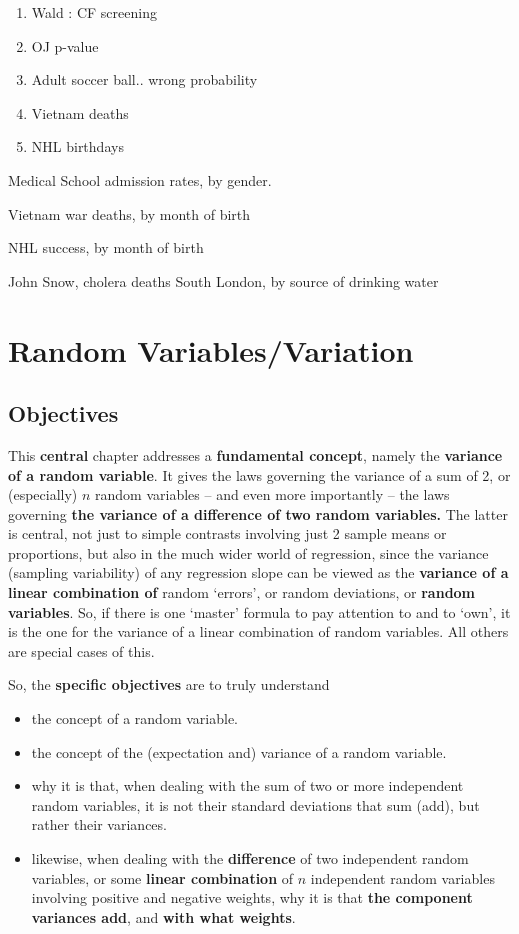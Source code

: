 \documentclass[]{book}
\begin{document}
\begin{enumerate}
\def\labelenumi{\arabic{enumi}.}
\setcounter{enumi}{7}
\item
  Wald : CF screening
\item
  OJ p-value
\item
  Adult soccer ball.. wrong probability
\item
  Vietnam deaths
\item
  NHL birthdays
\end{enumerate}

Medical School admission rates, by gender.

Vietnam war deaths, by month of birth

NHL success, by month of birth

John Snow, cholera deaths South London, by source of drinking water

\hypertarget{randomVariables}{%
\chapter{Random Variables/Variation}\label{randomVariables}}

\hypertarget{objectives-1}{%
\section{Objectives}\label{objectives-1}}

This \textbf{central} chapter addresses a \textbf{fundamental concept}, namely the \textbf{variance of a random variable}. It gives the laws governing the variance of a sum of 2, or (especially) \(n\) random variables -- and even more importantly -- the laws governing \textbf{the variance of a difference of two random variables.} The latter is central, not just to simple contrasts involving just 2 sample means or proportions, but also in the much wider world of regression, since the variance (sampling variability) of any regression slope can be viewed as the \textbf{variance of a linear combination of} random `errors', or random deviations, or \textbf{random variables}. So, if there is one `master' formula to pay attention to and to `own', it is the one for the variance of a linear combination of random variables. All others are special cases of this.

So, the \textbf{specific objectives} are to truly understand

\begin{itemize}
\item
  the concept of a random variable.
\item
  the concept of the (expectation and) variance of a random variable.
\item
  why it is that, when dealing with the sum of two or more independent random variables, it is not their standard deviations that sum (add), but rather their variances.
\item
  likewise, when dealing with the \textbf{difference} of two independent random variables, or some \textbf{linear combination} of \(n\) independent random variables involving positive and negative weights, why it is that \textbf{the component variances add}, and \textbf{with what weights}.
\end{itemize}
\end{document}

